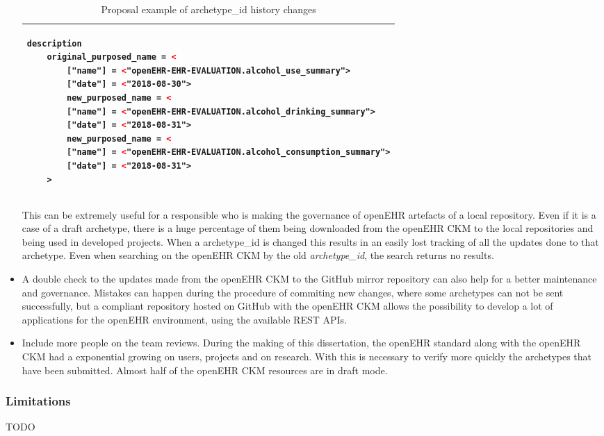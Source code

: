 \documentclass[mim_thesis.tex]{subfiles}
\begin{document}
\begin{itemize}
\begin{table}[H]
\caption{Proposal example of archetype\_id history changes}
\label{tab:ngmoduleexample}
\centering
\begin{tabular}{l}
\toprule[2pt]
\begin{lstlisting}[language=XML]
description
	original_purposed_name = <
		["name"] = <"openEHR-EHR-EVALUATION.alcohol_use_summary">
		["date"] = <"2018-08-30">
        new_purposed_name = <
		["name"] = <"openEHR-EHR-EVALUATION.alcohol_drinking_summary">
		["date"] = <"2018-08-31">
        new_purposed_name = <
		["name"] = <"openEHR-EHR-EVALUATION.alcohol_consumption_summary">
		["date"] = <"2018-08-31">
	>

\end{lstlisting}
\tabularnewline \bottomrule[2pt]
\end{tabular}
\end{table}

This can be extremely useful for a responsible who is making the governance of openEHR artefacts of a local repository. Even if it is a case of a draft archetype, there is a huge percentage of them being downloaded from the openEHR CKM to the local repositories and being used in developed projects. When a archetype\_id is changed this results in an easily lost tracking of all the updates done to that archetype. Even when searching on the openEHR CKM by the old \textit{archetype\_id}, the search returns no results.

\item A double check to the updates made from the openEHR CKM to the GitHub mirror repository can also help for a better maintenance and governance. Mistakes can happen during the procedure of commiting new changes, where some archetypes can not be sent successfully, but a compliant repository hosted on GitHub with the openEHR CKM allows the possibility to develop a lot of applications for the openEHR environment, using the available REST APIs. 

\item Include more people on the team reviews. During the making of this dissertation, the openEHR standard along with the openEHR CKM had a exponential growing on users, projects and on research. With this is necessary to verify more quickly the archetypes that have been submitted. Almost half of the openEHR CKM resources are in draft mode.  

\end{itemize}   

\subsubsection{Limitations}
TODO
\end{document}

